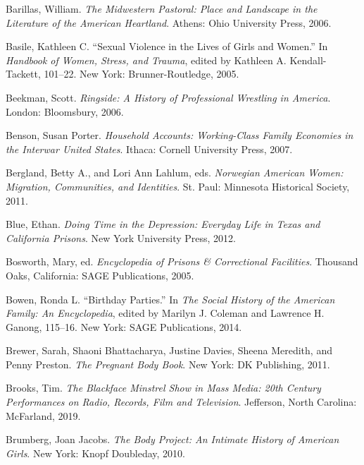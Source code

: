 \documentclass[
  american,
  letterpaper,
]{book}
\newlength{\cslhangindent}
\newenvironment{CSLReferences}[2] %
 {\begin{list}{}{%
  \setlength{\itemindent}{0pt}
  \setlength{\leftmargin}{0pt}
  \setlength{\parsep}{0pt}
  \ifodd #1
   \setlength{\leftmargin}{\cslhangindent}
   \setlength{\itemindent}{-1\cslhangindent}
  \fi
  \setlength{\itemsep}{#2\baselineskip}}}
 {\end{list}}
\begin{document}
\begin{CSLReferences}{1}{0}
Barillas, William. \emph{The Midwestern Pastoral: Place and Landscape in
the Literature of the American Heartland}. Athens: Ohio University
Press, 2006.

Basile, Kathleen C. {``Sexual Violence in the Lives of Girls and
Women.''} In \emph{Handbook of Women, Stress, and Trauma}, edited by
Kathleen A. Kendall-Tackett, 101--22. New York: Brunner-Routledge, 2005.

Beekman, Scott. \emph{Ringside: A History of Professional Wrestling in
America}. London: Bloomsbury, 2006.

Benson, Susan Porter. \emph{Household Accounts: Working-Class Family
Economies in the Interwar United States}. Ithaca: Cornell University
Press, 2007.

Bergland, Betty A., and Lori Ann Lahlum, eds. \emph{Norwegian American
Women: Migration, Communities, and Identities}. St. Paul: Minnesota
Historical Society, 2011.

Blue, Ethan. \emph{Doing Time in the Depression: Everyday Life in Texas
and California Prisons}. New York University Press, 2012.

Bosworth, Mary, ed. \emph{Encyclopedia of Prisons \& Correctional
Facilities}. Thousand Oaks, California: SAGE Publications, 2005.

Bowen, Ronda L. {``Birthday Parties.''} In \emph{The Social History of
the American Family: An Encyclopedia}, edited by Marilyn J. Coleman and
Lawrence H. Ganong, 115--16. New York: SAGE Publications, 2014.

Brewer, Sarah, Shaoni Bhattacharya, Justine Davies, Sheena Meredith, and
Penny Preston. \emph{The Pregnant Body Book}. New York: DK Publishing,
2011.

Brooks, Tim. \emph{The Blackface Minstrel Show in Mass Media: 20th
Century Performances on Radio, Records, Film and Television}. Jefferson,
North Carolina: McFarland, 2019.

Brumberg, Joan Jacobs. \emph{The Body Project: An Intimate History of
American Girls}. New York: Knopf Doubleday, 2010.


\end{CSLReferences}
\end{document}

